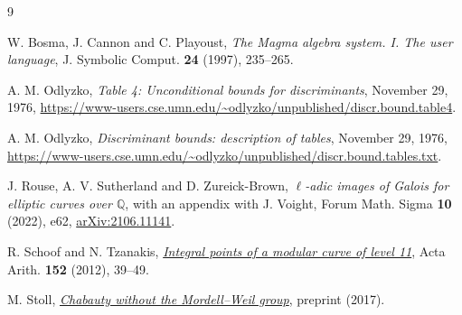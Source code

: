 \documentclass[11pt,reqno]{amsart}
\newcommand{\Q}{\mathbb Q}\newcommand{\Z}{\mathbb Z}
\theoremstyle{definition}\newtheorem{definition}[theorem]{Definition}
\theoremstyle{remark}\newtheorem{remark}[theorem]{Remark}
\numberwithin{equation}{section}
\begin{document}
\begin{thebibliography}{9}

W. Bosma, J. Cannon and C. Playoust,
\emph{The Magma algebra system. I. The user language},
J. Symbolic Comput. \textbf{24} (1997), 235--265.

A. M. Odlyzko,
\emph{Table 4: Unconditional bounds for discriminants},
November 29, 1976,
\url{https://www-users.cse.umn.edu/~odlyzko/unpublished/discr.bound.table4}.

A. M. Odlyzko,
\emph{Discriminant bounds: description of tables},
November 29, 1976,
\url{https://www-users.cse.umn.edu/~odlyzko/unpublished/discr.bound.tables.txt}.

J. Rouse, A. V. Sutherland and D. Zureick-Brown,
\emph{\(\ell\)-adic images of Galois for elliptic curves over
\(\Q\)}, with an appendix with J. Voight,
Forum Math. Sigma \textbf{10} (2022), e62,
\href{https://arxiv.org/abs/2106.11141}{arXiv:2106.11141}.

R. Schoof and N. Tzanakis,
\href{https://www.mat.uniroma2.it/~schoof/AA-schoof-tzanakis.pdf}
{\emph{Integral points of a modular curve of level 11}},
Acta Arith. \textbf{152} (2012), 39--49.

M. Stoll,
\href{https://www.mathe2.uni-bayreuth.de/stoll/papers/ratpts-selmer-2016-12-07.pdf}
{\emph{Chabauty without the Mordell--Weil group}}, preprint (2017).
\end{thebibliography}
\end{document}
